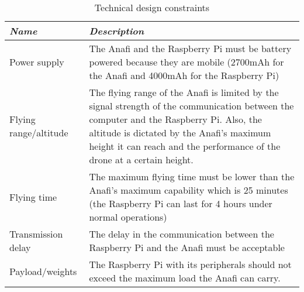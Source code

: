 \documentclass[../main.tex]{subfiles}
\begin{document}
\begin{table}[H]
    \centering
    \caption{Technical design constraints}
    \label{tab:technical-design-constraints}
    \begin{tabular}{ P{2.8cm} P{12.2cm} }
        \toprule
        \textit{Name} 
            & \textit{Description} \\

        \midrule

        Power supply  
            & The Anafi and the Raspberry Pi must be 
            battery powered because they are mobile 
            (2700mAh for the Anafi 
            and 4000mAh for the Raspberry Pi)  \\

        Flying range/altitude 
            & The flying range of the Anafi is limited 
            by the signal strength of the communication 
            between the computer and the Raspberry Pi. 
            Also, the altitude is dictated by the Anafi’s 
            maximum height it can reach and the performance 
            of the drone at a certain height. \\

        Flying time  
            & The maximum flying time must be lower than 
            the Anafi’s maximum capability which is 25 minutes 
            (the Raspberry Pi can last for 4 hours under normal
            operations) \\ 

        Transmission delay  
            & The delay in the communication between 
            the Raspberry Pi and the Anafi must be acceptable \\

        Payload/weights  
            & The Raspberry Pi with its peripherals should not 
            exceed the maximum load the Anafi can carry. \\

        \bottomrule
    \end{tabular}
\end{table}
\end{document}
